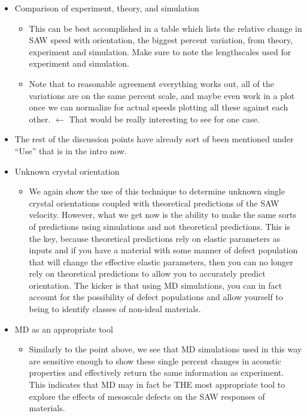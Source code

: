 
\begin{itemize}
\item Comparison of experiment, theory, and simulation
	\begin{itemize}
	\item This can be best accomplished in a table which lists the relative change in SAW speed with orientation, the biggest percent variation, from theory, experiment and simulation. Make sure to note the lengthscales used for experiment and simulation.
	\item Note that to reasonable agreement everything works out, all of the variations are on the same percent scale, and maybe even work in a plot once we can normalize for actual speeds plotting all these against each other. $\leftarrow$ That would be really interesting to see for one case.
	\end{itemize}
\item The rest of the discussion points have already sort of been mentioned under ``Use'' that is in the intro now.
\item Unknown crystal orientation
	\begin{itemize}
	\item We again show the use of this technique to determine unknown single crystal orientations coupled with theoretical predictions of the SAW velocity. However, what we get now is the ability to make the same sorts of predictions using simulations and not theoretical predictions. This is the key, because theoretical predictions rely on elastic parameters as inputs and if you have a material with some manner of defect population that will change the effective elastic parameters, then you can no longer rely on theoretical predictions to allow you to accurately predict orientation. The kicker is that using MD simulations, you can in fact account for the possibility of defect populations and allow yourself to being to identify classes of non-ideal materials.
	\end{itemize}
\item MD as an appropriate tool
	\begin{itemize}
	\item Similarly to the point above, we see that MD simulations used in this way are sensitive enough to show these single percent changes in acoustic properties and effectively return the same information as experiment. This indicates that MD may in fact be THE most appropriate tool to explore the effects of mesoscale defects on the SAW responses of materials.

\end{itemize}
\end{itemize}
